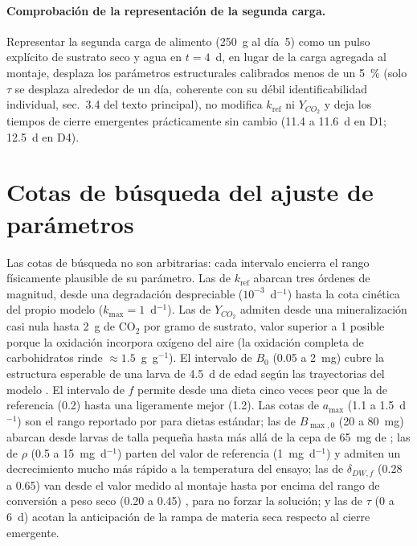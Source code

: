 \documentclass[11pt,a4paper]{article}
\begin{document}
\paragraph{Comprobación de la representación de la segunda carga.}
Representar la segunda carga de alimento (250~g al día~5) como un pulso explícito de sustrato seco y agua en $t = 4$~d, en lugar de la carga agregada al montaje, desplaza los parámetros estructurales calibrados menos de un 5~\% (solo $\tau$ se desplaza alrededor de un día, coherente con su débil identificabilidad individual, sec.~3.4 del texto principal), no modifica $k_{\mathrm{ref}}$ ni $Y_{CO_2}$ y deja los tiempos de cierre emergentes prácticamente sin cambio (11.4 a 11.6~d en D1; 12.5~d en D4).

\section{Cotas de búsqueda del ajuste de parámetros}
\label{sec:cotas}

Las cotas de búsqueda no son arbitrarias: cada intervalo encierra el rango físicamente plausible de su parámetro. Las de $k_{\mathrm{ref}}$ abarcan tres órdenes de magnitud, desde una degradación despreciable ($10^{-3}$~d$^{-1}$) hasta la cota cinética del propio modelo ($k_{\max} = 1$~d$^{-1}$). Las de $Y_{CO_2}$ admiten desde una mineralización casi nula hasta 2~g de CO$_2$ por gramo de sustrato, valor superior a 1 posible porque la oxidación incorpora oxígeno del aire (la oxidación completa de carbohidratos rinde $\approx 1.5$~g~g$^{-1}$). El intervalo de $B_0$ (0.05 a 2~mg) cubre la estructura esperable de una larva de 4.5~d de edad según las trayectorias del modelo \parencite{eriksenDynamicModellingFeed2022}. El intervalo de $f$ permite desde una dieta cinco veces peor que la de referencia (0.2) hasta una ligeramente mejor (1.2). Las cotas de $a_{\max}$ (1.1 a 1.5~d$^{-1}$) son el rango reportado por \textcite{eriksenDynamicModellingFeed2022} para dietas estándar; las de $B_{\max,0}$ (20 a 80~mg) abarcan desde larvas de talla pequeña hasta más allá de la cepa de 65~mg de \textcite{eriksenDynamicModellingFeed2022}; las de $\rho$ (0.5 a 15~mg~d$^{-1}$) parten del valor de referencia (1~mg~d$^{-1}$) y admiten un decrecimiento mucho más rápido a la temperatura del ensayo; las de $\delta_{DW,f}$ (0.28 a 0.65) van desde el valor medido al montaje hasta por encima del rango de conversión a peso seco (0.20 a 0.45) \parencite{eriksenDynamicModellingFeed2022}, para no forzar la solución; y las de $\tau$ (0 a 6~d) acotan la anticipación de la rampa de materia seca respecto al cierre emergente.
\end{document}

